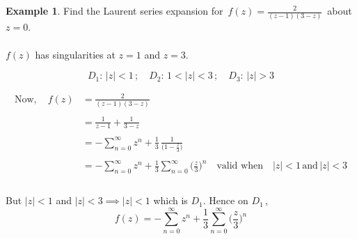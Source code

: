 \documentclass[11pt,a4paper]{article}
\theoremstyle{definition}
\newtheorem{example}[thm]{Example}
\begin{document}
\begin{example}
Find the Laurent series expansion for $\,f(z) = \frac{2}{(z - 1)(3 - z)}\,$ about $z = 0$.\\

\text{\textcolor{red}{Working}}\\
$f(z)$ has singularities at $z = 1$ and $z = 3$.



\begin{figure}[H]
\centering
{}
\end{figure}










$$D_1: \,\left|z\right| < 1\,;\quad  D_2:\, 1 < \left|z\right|< 3\,;\quad  D_3:\,\left|z\right|>3$$

\begin{align*}
\text{Now},\quad  f(z) & = \frac{2}{(z - 1)(3 - z)}\\\\
& =  \frac{1}{z - 1} + \frac{1}{3 - z}\\\\
& = - \sum^{\infty}_{n = 0}z^n + \frac{1}{3}\,\frac{1}{\Big(1 - \frac{z}{3}\Big)}\\\\
& = - \sum^{\infty}_{n = 0}z^n + \frac{1}{3}\sum^{\infty}_{n  = 0}\Big(\frac{z}{3}\Big)^n\quad \text{valid when}\quad \left|z\right|< 1\,\text{and}\,\left|z\right|<3\\\\
\end{align*}



But $\left|z\right| < 1$ and $\left|z\right| < 3\implies \left|z\right| < 1$ which is $D_1$. Hence on $D_1\,$,
$$f(z) = -\sum^{\infty}_{n = 0} z^n + \frac{1}{3}\sum^{\infty}_{n = 0} \Big(\frac{z}{3}\Big)^n$$\\



\end{example}
\end{document}
